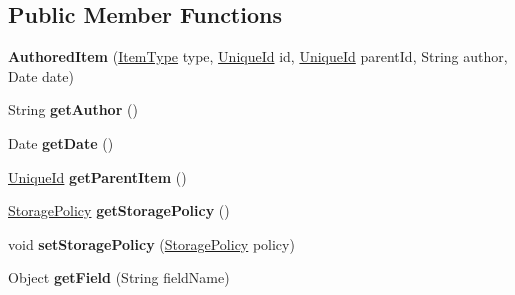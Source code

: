 \subsection*{Public Member Functions}
\begin{DoxyCompactItemize}
\item 
\hypertarget{classcom_1_1ualberta_1_1team17_1_1_authored_item_abc4e06258bfbc8a43c46a4236a52b670}{{\bfseries Authored\+Item} (\hyperlink{enumcom_1_1ualberta_1_1team17_1_1_item_type}{Item\+Type} type, \hyperlink{classcom_1_1ualberta_1_1team17_1_1_unique_id}{Unique\+Id} id, \hyperlink{classcom_1_1ualberta_1_1team17_1_1_unique_id}{Unique\+Id} parent\+Id, String author, Date date)}\label{classcom_1_1ualberta_1_1team17_1_1_authored_item_abc4e06258bfbc8a43c46a4236a52b670}

\item 
\hypertarget{classcom_1_1ualberta_1_1team17_1_1_authored_item_aff08560acf1d6bf4b1bb83cfdc658ce4}{String {\bfseries get\+Author} ()}\label{classcom_1_1ualberta_1_1team17_1_1_authored_item_aff08560acf1d6bf4b1bb83cfdc658ce4}

\item 
\hypertarget{classcom_1_1ualberta_1_1team17_1_1_authored_item_a53225046653bbbf70c6f1a67d7bc9dd5}{Date {\bfseries get\+Date} ()}\label{classcom_1_1ualberta_1_1team17_1_1_authored_item_a53225046653bbbf70c6f1a67d7bc9dd5}

\item 
\hypertarget{classcom_1_1ualberta_1_1team17_1_1_authored_item_a0250756af6c8dcc655c445a6d7d8504a}{\hyperlink{classcom_1_1ualberta_1_1team17_1_1_unique_id}{Unique\+Id} {\bfseries get\+Parent\+Item} ()}\label{classcom_1_1ualberta_1_1team17_1_1_authored_item_a0250756af6c8dcc655c445a6d7d8504a}

\item 
\hypertarget{classcom_1_1ualberta_1_1team17_1_1_authored_item_a34b97ef54cb9f141ce6e53c537327aec}{\hyperlink{enumcom_1_1ualberta_1_1team17_1_1_storage_policy}{Storage\+Policy} {\bfseries get\+Storage\+Policy} ()}\label{classcom_1_1ualberta_1_1team17_1_1_authored_item_a34b97ef54cb9f141ce6e53c537327aec}

\item 
\hypertarget{classcom_1_1ualberta_1_1team17_1_1_authored_item_aa765319a5754c5dd7e90ae05cebd6465}{void {\bfseries set\+Storage\+Policy} (\hyperlink{enumcom_1_1ualberta_1_1team17_1_1_storage_policy}{Storage\+Policy} policy)}\label{classcom_1_1ualberta_1_1team17_1_1_authored_item_aa765319a5754c5dd7e90ae05cebd6465}

\item 
\hypertarget{classcom_1_1ualberta_1_1team17_1_1_authored_item_aa43d904bb10e1506671fa82bf0c1c5d7}{Object {\bfseries get\+Field} (String field\+Name)}\label{classcom_1_1ualberta_1_1team17_1_1_authored_item_aa43d904bb10e1506671fa82bf0c1c5d7}

\end{DoxyCompactItemize}

